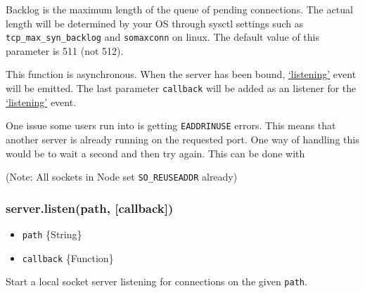Backlog is the maximum length of the queue of pending connections. The
actual length will be determined by your OS through sysctl settings such
as \texttt{tcp\_max\_syn\_backlog} and \texttt{somaxconn} on linux. The
default value of this parameter is 511 (not 512).

This function is asynchronous. When the server has been bound,
\hyperref[netux5feventux5flistening]{`listening'} event will be emitted.
The last parameter \texttt{callback} will be added as an listener for
the \hyperref[netux5feventux5flistening]{`listening'} event.

One issue some users run into is getting \texttt{EADDRINUSE} errors.
This means that another server is already running on the requested port.
One way of handling this would be to wait a second and then try again.
This can be done with

\begin{Shaded}
\begin{Highlighting}[]
\NormalTok{(}\NormalTok{, } 
   \NormalTok{(} \NormalTok{== }\NormalTok{) \{}
    \NormalTok{(}\NormalTok{);}
    \NormalTok{(} \NormalTok{() \{}
      \NormalTok{();}
    \NormalTok{\}, }\NormalTok{);}
  \NormalTok{\}}
\NormalTok{\});}
\end{Highlighting}
\end{Shaded}

(Note: All sockets in Node set \texttt{SO\_REUSEADDR} already)

\subsubsection{server.listen(path,
{[}callback{]})}\label{server.listenpath-callback}

\begin{itemize}
\itemsep1pt\parskip0pt
\item
  \texttt{path} \{String\}
\item
  \texttt{callback} \{Function\}
\end{itemize}

Start a local socket server listening for connections on the given
\texttt{path}.

